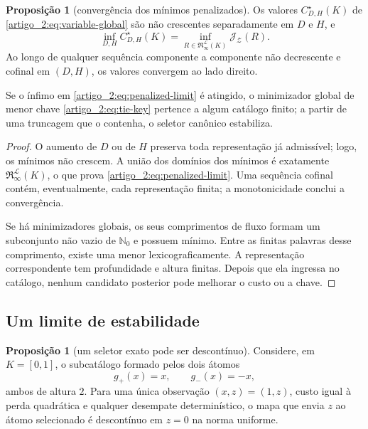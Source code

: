 \documentclass[12pt,a4paper]{article}
\theoremstyle{preciso}
\theoremstyle{definition}
\newcommand{\Nzero}{\mathbb{N}_0}
\newcommand{\Library}{\mathcal{L}}
\newcommand{\Representations}{\mathfrak{R}}
\newcommand{\cost}{\mathcal{J}}
\theoremstyle{preciso}
\theoremstyle{preciso}
\theoremstyle{preciso}
\newtheorem{proposition}[teorema]{Proposição}
\theoremstyle{preciso}
\theoremstyle{definition}
\theoremstyle{preciso}
\theoremstyle{definition}
\theoremstyle{preciso}
\theoremstyle{preciso}
\theoremstyle{definition}
\begin{document}
\begin{proposition}[convergência dos mínimos penalizados]\label{map:artigo_2:9.4}
\label{artigo_2:prop:truncation-convergence}
Os valores $C_{D,H}^{\star}(K)$ de \eqref{artigo_2:eq:variable-global} são não
crescentes separadamente em $D$ e $H$, e
\begin{equation}
 \inf_{D,H}C_{D,H}^{\star}(K)
 =\inf_{R\in\Representations_{\infty}^{\Library}(K)}
   \cost_{\mathcal Z}(R).
 \label{artigo_2:eq:penalized-limit}
\end{equation}
Ao longo de qualquer sequência componente a componente não decrescente e
cofinal em $(D,H)$, os valores convergem ao lado direito.

Se o ínfimo em \eqref{artigo_2:eq:penalized-limit} é atingido, o minimizador global de
menor chave \eqref{artigo_2:eq:tie-key} pertence a algum catálogo finito; a partir de
uma truncagem que o contenha, o seletor canônico estabiliza.
\end{proposition}

\begin{proof}
O aumento de $D$ ou de $H$ preserva toda representação já admissível; logo, os
mínimos não crescem. A união dos domínios dos mínimos é exatamente
$\Representations_{\infty}^{\Library}(K)$, o que prova
\eqref{artigo_2:eq:penalized-limit}. Uma sequência cofinal contém, eventualmente, cada
representação finita; a monotonicidade conclui a convergência.

Se há minimizadores globais, os seus comprimentos de fluxo formam um subconjunto
não vazio de $\Nzero$ e possuem mínimo. Entre as finitas palavras desse
comprimento, existe uma menor lexicograficamente. A representação
correspondente tem profundidade e altura finitas. Depois que ela ingressa no
catálogo, nenhum candidato posterior pode melhorar o custo ou a chave.
\end{proof}

\subsection{Um limite de estabilidade}

\begin{proposition}[um seletor exato pode ser descontínuo]\label{map:artigo_2:9.5}
\label{artigo_2:prop:instability}
Considere, em $K=[0,1]$, o subcatálogo formado pelos dois átomos
\[
 g_+(x)=x,\qquad g_-(x)=-x,
\]
ambos de altura $2$. Para uma única observação $(x,z)=(1,z)$, custo igual à
perda quadrática e qualquer desempate determinístico, o mapa que envia $z$ ao
átomo selecionado é descontínuo em $z=0$ na norma uniforme.
\end{proposition}
\end{document}
